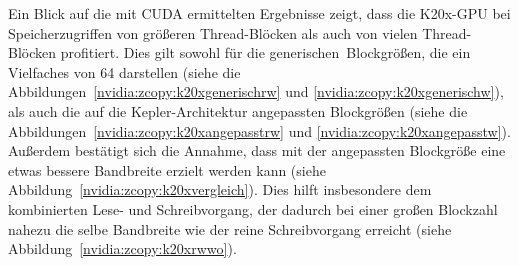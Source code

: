 Ein Blick auf die mit CUDA ermittelten Ergebnisse zeigt, dass die K20x-GPU bei
Speicherzugriffen von größeren Thread-Blöcken als auch von vielen Thread-Blöcken
profitiert. Dies gilt sowohl für die \glqq generischen\grqq\ Blockgrößen, die
ein Vielfaches von \num{64} darstellen (siehe die
Abbildungen~\ref{nvidia:zcopy:k20xgenerischrw} und
\ref{nvidia:zcopy:k20xgenerischw}), als auch die auf die Kepler-Architektur
angepassten Blockgrößen (siehe die
Abbildungen~\ref{nvidia:zcopy:k20xangepasstrw} und
\ref{nvidia:zcopy:k20xangepasstw}). Außerdem bestätigt sich die Annahme, dass
mit der angepassten Blockgröße eine etwas bessere Bandbreite erzielt werden kann
(siehe Abbildung~\ref{nvidia:zcopy:k20xvergleich}). Dies hilft insbesondere dem
kombinierten Lese- und Schreibvorgang, der dadurch bei einer großen Blockzahl
nahezu die selbe Bandbreite wie der reine Schreibvorgang erreicht (siehe
Abbildung~\ref{nvidia:zcopy:k20xrwwo}).


